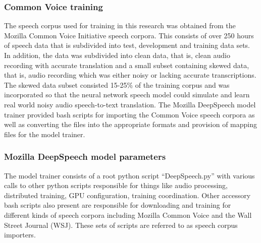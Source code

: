 \subsubsection{Common Voice training}
The speech corpus used for training in this research was obtained from the Mozilla Common Voice Initiative speech corpora.  This consists of over 250 hours of speech data that is subdivided into test, development and training data sets.  In addition, the data was subdivided into clean data, that is, clean audio recording with accurate translation and a small subset containing skewed data, that is, audio recording which was either noisy or lacking accurate transcriptions.  The skewed data subset consisted 15-25\% of the training corpus and was incorporated so that the neural network speech model could simulate and learn real world noisy audio speech-to-text translation.  The Mozilla DeepSpeech model trainer provided bash scripts for importing the Common Voice speech corpora as well as converting the files into the appropriate formats and provision of mapping files for the model trainer.
\subsubsection{Mozilla DeepSpeech model parameters}
The model trainer consists of a root python script ``DeepSpeech.py'' with various calls to other python scripts responsible for things like audio processing, distributed training, GPU configuration, training coordination.  Other accessory bash scripts also present are responsible for downloading and training for different kinds of speech corpora including Mozilla Common Voice\citep{mozilla/deepspeech_2019} and the Wall Street Journal (WSJ)\citep{paul1992design}.  These sets of scripts are referred to as speech corpus importers. 

